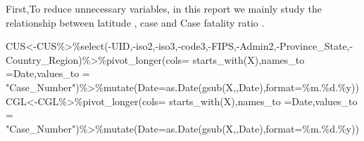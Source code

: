 \documentclass[
]{article}
\newenvironment{Shaded}{\begin{snugshade}}{\end{snugshade}}
\newcommand{\AttributeTok}[1]{\textcolor[rgb]{0.77,0.63,0.00}{#1}}
\newcommand{\FunctionTok}[1]{\textcolor[rgb]{0.00,0.00,0.00}{#1}}
\newcommand{\NormalTok}[1]{#1}
\newcommand{\OtherTok}[1]{\textcolor[rgb]{0.56,0.35,0.01}{#1}}
\newcommand{\SpecialCharTok}[1]{\textcolor[rgb]{0.00,0.00,0.00}{#1}}
\newcommand{\StringTok}[1]{\textcolor[rgb]{0.31,0.60,0.02}{#1}}
\begin{document}
First,To reduce unnecessary variables, in this report we mainly study
the relationship between latitude , case and Case fatality ratio .

\begin{Shaded}
\begin{Highlighting}[]
\NormalTok{CUS}\OtherTok{\textless{}{-}}\NormalTok{CUS}\SpecialCharTok{\%\textgreater{}\%}\FunctionTok{select}\NormalTok{(}\SpecialCharTok{{-}}\NormalTok{UID,}\SpecialCharTok{{-}}\NormalTok{iso2,}\SpecialCharTok{{-}}\NormalTok{iso3,}\SpecialCharTok{{-}}\NormalTok{code3,}\SpecialCharTok{{-}}\NormalTok{FIPS,}\SpecialCharTok{{-}}\NormalTok{Admin2,}\SpecialCharTok{{-}}\NormalTok{Province\_State,}\SpecialCharTok{{-}}\NormalTok{Country\_Region)}\SpecialCharTok{\%\textgreater{}\%}\FunctionTok{pivot\_longer}\NormalTok{(}\AttributeTok{cols=} \FunctionTok{starts\_with}\NormalTok{(}\StringTok{\textquotesingle{}X\textquotesingle{}}\NormalTok{),}\AttributeTok{names\_to =}\StringTok{\textquotesingle{}Date\textquotesingle{}}\NormalTok{,}\AttributeTok{values\_to =} \StringTok{"Case\_Number"}\NormalTok{)}\SpecialCharTok{\%\textgreater{}\%}\FunctionTok{mutate}\NormalTok{(}\AttributeTok{Date=}\FunctionTok{as.Date}\NormalTok{(}\FunctionTok{gsub}\NormalTok{(}\StringTok{\textquotesingle{}X\textquotesingle{}}\NormalTok{,}\StringTok{\textquotesingle{}\textquotesingle{}}\NormalTok{,Date),}\AttributeTok{format=}\StringTok{\textquotesingle{}\%m.\%d.\%y\textquotesingle{}}\NormalTok{))}
\NormalTok{CGL}\OtherTok{\textless{}{-}}\NormalTok{CGL}\SpecialCharTok{\%\textgreater{}\%}\FunctionTok{pivot\_longer}\NormalTok{(}\AttributeTok{cols=} \FunctionTok{starts\_with}\NormalTok{(}\StringTok{\textquotesingle{}X\textquotesingle{}}\NormalTok{),}\AttributeTok{names\_to =}\StringTok{\textquotesingle{}Date\textquotesingle{}}\NormalTok{,}\AttributeTok{values\_to =} \StringTok{"Case\_Number"}\NormalTok{)}\SpecialCharTok{\%\textgreater{}\%}\FunctionTok{mutate}\NormalTok{(}\AttributeTok{Date=}\FunctionTok{as.Date}\NormalTok{(}\FunctionTok{gsub}\NormalTok{(}\StringTok{\textquotesingle{}X\textquotesingle{}}\NormalTok{,}\StringTok{\textquotesingle{}\textquotesingle{}}\NormalTok{,Date),}\AttributeTok{format=}\StringTok{\textquotesingle{}\%m.\%d.\%y\textquotesingle{}}\NormalTok{))}

\end{Highlighting}
\end{Shaded}
\end{document}
